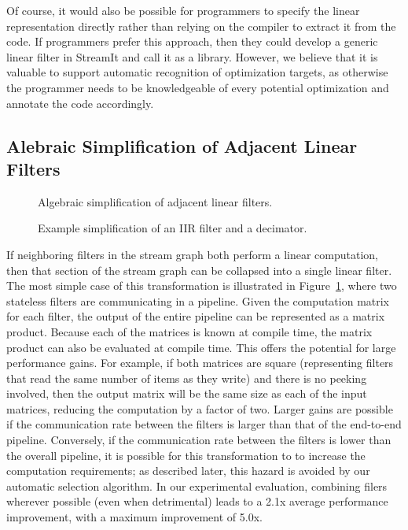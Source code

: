 Of course, it would also be possible for programmers to specify the
linear representation directly rather than relying on the compiler to
extract it from the code.  If programmers prefer this approach, then
they could develop a generic linear filter in StreamIt and call it as
a library.  However, we believe that it is valuable to support
automatic recognition of optimization targets, as otherwise the
programmer needs to be knowledgeable of every potential optimization
and annotate the code accordingly.

\subsection*{Alebraic Simplification of Adjacent Linear Filters}

\begin{figure}[t]
\caption{Algebraic simplification of adjacent linear filters.\protect\label{fig:combination}}
\end{figure}

\begin{figure}[t]
\caption{Example simplification of an IIR filter and a decimator.\protect\label{fig:combination-example}}
\end{figure}

If neighboring filters in the stream graph both perform a linear
computation, then that section of the stream graph can be collapsed
into a single linear filter.  The most simple case of this
transformation is illustrated in Figure~\ref{fig:combination}, where
two stateless filters are communicating in a pipeline.  Given the
computation matrix for each filter, the output of the entire pipeline
can be represented as a matrix product.  Because each of the matrices
is known at compile time, the matrix product can also be evaluated at
compile time.  This offers the potential for large performance gains.
For example, if both matrices are square (representing filters that
read the same number of items as they write) and there is no peeking
involved, then the output matrix will be the same size as each of the
input matrices, reducing the computation by a factor of two.  Larger
gains are possible if the communication rate between the filters is
larger than that of the end-to-end pipeline.  Conversely, if the
communication rate between the filters is lower than the overall
pipeline, it is possible for this transformation to to increase the
computation requirements; as described later, this hazard is avoided
by our automatic selection algorithm.  In our experimental evaluation,
combining filers wherever possible (even when detrimental) leads to a
2.1x average performance improvement, with a maximum improvement of
5.0x.

